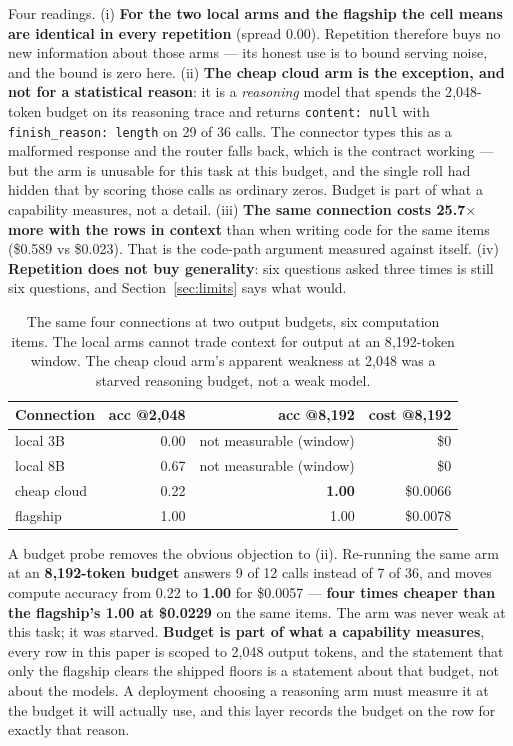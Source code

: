 \documentclass[11pt]{article}
\newcommand{\code}[1]{\texttt{#1}}
\begin{document}
Four readings. (i) \textbf{For the two local arms and the flagship the cell means are identical
in every repetition} (spread 0.00). Repetition therefore buys no new information about those
arms --- its honest use is to bound serving noise, and the bound is zero here. (ii) \textbf{The
cheap cloud arm is the exception, and not for a statistical reason}: it is a \emph{reasoning}
model that spends the 2{,}048-token budget on its reasoning trace and returns
\code{content: null} with \code{finish\_reason: length} on 29 of 36 calls. The connector types
this as a malformed response and the router falls back, which is the contract working --- but the
arm is unusable for this task at this budget, and the single roll had hidden that by scoring
those calls as ordinary zeros. Budget is part of what a capability measures, not a detail.
(iii) \textbf{The same connection costs 25.7$\times$ more with the rows in context} than when
writing code for the same items (\$0.589 vs \$0.023). That is the code-path argument measured
against itself. (iv) \textbf{Repetition does not buy generality}: six questions asked three times
is still six questions, and Section~\ref{sec:limits} says what would.

\begin{table}[h]
\centering
\small
\begin{tabular}{@{}lrrr@{}}
\toprule
\textbf{Connection} & \textbf{acc @2{,}048} & \textbf{acc @8{,}192} & \textbf{cost @8{,}192} \\
\midrule
local 3B   & 0.00 & not measurable (window) & \$0 \\
local 8B   & 0.67 & not measurable (window) & \$0 \\
cheap cloud & 0.22 & \textbf{1.00} & \$0.0066 \\
flagship    & 1.00 & 1.00 & \$0.0078 \\
\bottomrule
\end{tabular}
\caption{The same four connections at two output budgets, six computation items. The local arms
cannot trade context for output at an 8{,}192-token window. The cheap cloud arm's apparent
weakness at 2{,}048 was a starved reasoning budget, not a weak model.}
\end{table}

A budget probe removes the obvious objection to (ii). Re-running the same arm at an
\textbf{8{,}192-token budget} answers 9 of 12 calls instead of 7 of 36, and moves compute accuracy
from 0.22 to \textbf{1.00} for \$0.0057 --- \textbf{four times cheaper than the flagship's 1.00 at
\$0.0229} on the same items. The arm was never weak at this task; it was starved. \textbf{Budget
is part of what a capability measures}, every row in this paper is scoped to 2{,}048 output
tokens, and the statement that only the flagship clears the shipped floors is a statement about
that budget, not about the models. A deployment choosing a reasoning arm must measure it at the
budget it will actually use, and this layer records the budget on the row for exactly that
reason.
\end{document}

